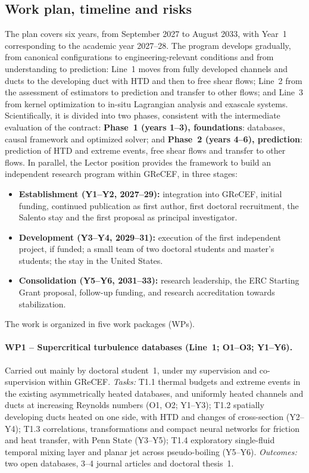 \documentclass[11pt]{article}
\begin{document}
\subsection{Work plan, timeline and risks}\label{sec:workplan}
The plan covers six years, from September 2027 to August 2033, with Year~1 corresponding to
the academic year 2027--28. The program develops gradually, from canonical configurations to
engineering-relevant conditions and from understanding to prediction: Line~1 moves from fully
developed channels and ducts to the developing duct with HTD and then to free shear flows;
Line~2 from the assessment of estimators to prediction and transfer to other flows; and Line~3
from kernel optimization to in-situ Lagrangian analysis and exascale systems. Scientifically, it is divided into two phases, consistent with the
intermediate evaluation of the contract: \textbf{Phase~1 (years 1--3), foundations}:
databases, causal framework and optimized solver; and \textbf{Phase~2 (years 4--6),
prediction}: prediction of HTD and extreme events, free shear flows and transfer to other
flows. In parallel, the Lector position
provides the framework to build an independent research program within GReCEF, in three
stages:
\begin{itemize}
  \item \textbf{Establishment (Y1--Y2, 2027--29):} integration into GReCEF, initial funding,
  continued publication as first author, first doctoral recruitment, the Salento stay and the first proposal as principal
  investigator.
  \item \textbf{Development (Y3--Y4, 2029--31):} execution of the first independent project,
  if funded; a small team of two doctoral students and master's students; the stay in the
  United States.
  \item \textbf{Consolidation (Y5--Y6, 2031--33):} research leadership, the ERC Starting Grant
  proposal, follow-up funding, and research accreditation towards stabilization.
\end{itemize}
The work is organized in five work packages (WPs).

\paragraph{WP1 -- Supercritical turbulence databases (Line~1; O1--O3; Y1--Y6).} Carried out
mainly by doctoral student~1, under my supervision and co-supervision within GReCEF.
\emph{Tasks:} T1.1 thermal budgets and extreme events in the existing asymmetrically heated
databases, and uniformly heated channels and ducts at increasing Reynolds numbers (O1, O2;
Y1--Y3); T1.2 spatially developing ducts heated on one side, with HTD and changes of cross-section (Y2--Y4); T1.3 correlations, transformations
and compact neural networks for friction and heat transfer, with Penn State (Y3--Y5); T1.4
exploratory single-fluid temporal mixing layer and planar jet across pseudo-boiling (Y5--Y6).
\emph{Outcomes:} two open databases, 3--4 journal articles and doctoral thesis~1.
\end{document}
